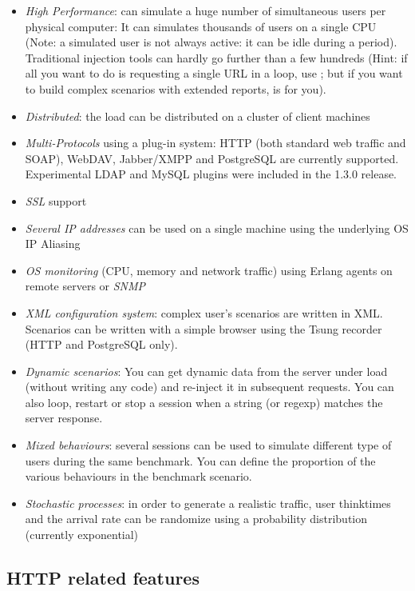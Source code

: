 \documentclass{TSUNG-en}
\begin{document}
\begin{itemize}
\item \emph{High Performance}:  can simulate a
  huge number of simultaneous users per physical computer: It can
  simulates thousands of users on a single CPU (Note: a simulated user
  is not always active: it can be idle during a 
  period). Traditional injection tools can hardly go further than a
  few hundreds (Hint: if all you want to do is requesting a single URL
  in a loop, use ; but if you want to build complex
  scenarios with extended reports,  is for you).
\item \emph{Distributed}: the load can be distributed on a cluster of
client machines
\item \emph{Multi-Protocols} using a plug-in system: HTTP (both standard
web traffic and SOAP),  WebDAV, Jabber/XMPP and PostgreSQL are currently
supported. Experimental LDAP and MySQL plugins were included in the 1.3.0 release.
\item \emph{SSL} support
\item \emph{Several IP addresses} can be used on a single machine using
the underlying OS IP Aliasing
\item \emph{OS monitoring} (CPU, memory and network traffic) using Erlang
agents on remote servers or \emph{SNMP}
\item \emph{XML configuration system}: complex user's scenarios are written
  in XML. Scenarios can be written with a simple browser using the
  Tsung recorder (HTTP and PostgreSQL only).
\item \emph{Dynamic scenarios}: You can get dynamic data from the
  server under load (without writing any code) and re-inject it in
  subsequent requests. You can also loop, restart or stop a
  session when a string (or regexp) matches the server response.
\item \emph{Mixed behaviours}: several sessions can be used to simulate
different type of users during the same benchmark. You can define
the proportion of the various behaviours in the benchmark scenario.
\item \emph{Stochastic processes}: in order to generate a realistic traffic,
user thinktimes and the arrival rate can be randomize using a probability
distribution (currently exponential)
\end{itemize}

\subsection{HTTP related features}
\end{document}
